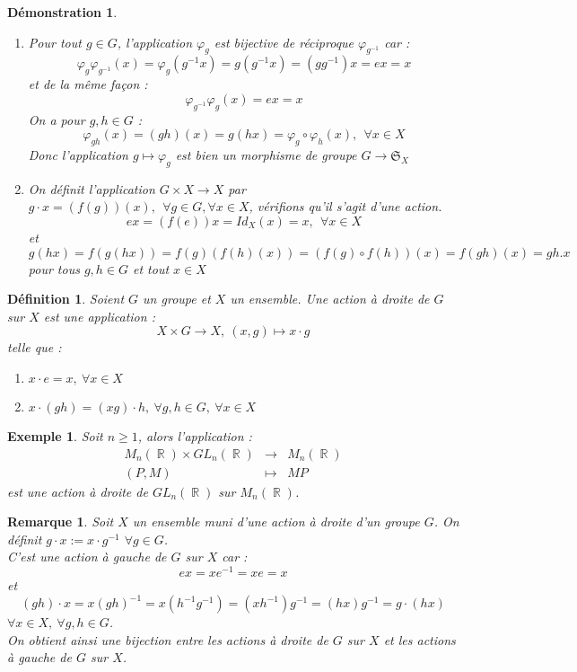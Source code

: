 \documentclass[a4paper, oneside]{report}
\theoremstyle{break}
\newtheorem{defi}[thm]{Définition}
\newtheorem{exem}[thm]{Exemple}
\newtheorem{remar}[thm]{Remarque}
\newtheorem*{demo}{Démonstration}
\newcommand{\x}{\times}
\DeclareMathOperator{\R}{\mathbb{R}}
\renewcommand{\S}{\mathfrak{S}}
\begin{document}
\begin{demo}
	\begin{enumerate}
		\item Pour tout $g\in G$, l'application $\varphi_g$ est bijective de réciproque $\varphi_{g^{-1}}$ car :
		$$\varphi_g\varphi_{g^{-1}}(x)=\varphi_g(g^{-1}x)=g(g^{-1}x)=(gg^{-1})x=ex=x$$
		et de la même façon :
		$$\varphi_{g^{-1}}\varphi_g(x)=ex=x$$
		On a pour $g,h\in G$ :
		$$\varphi_{gh}(x)=(gh)(x)=g(hx)=\varphi_g\circ \varphi_h(x),~~\forall x\in X$$
		Donc l'application $g\mapsto \varphi_g$ est bien un morphisme de groupe $G\rightarrow \S_X$
		\item On définit l'application $G\x X \rightarrow X$ par $g \cdot x = (f(g))(x),~~\forall g\in G,\forall x\in X$, vérifions qu'il s'agit d'une action.\\
		$$ex=(f(e))x=Id_X(x)=x,~~\forall x\in X$$
		et 
		$$g(hx)=f(g(hx))=f(g)(f(h)(x))=(f(g)\circ f(h) )(x)=f(gh)(x)=gh.x$$
		pour tous $g,h\in G$ et tout $x\in X$
	\end{enumerate}
\end{demo}


\begin{defi}
	Soient $G$ un groupe et $X$ un ensemble. Une action à droite de $G$ sur $X$ est une application :
	$$X\x G\rightarrow X,~(x,g)\mapsto x \cdot g$$
	telle que :
	\begin{enumerate}
		\item $x \cdot e=x,~\forall x\in X$
		\item $x \cdot (gh)=(xg) \cdot h,~\forall g,h\in G,~\forall x\in X$
	\end{enumerate}
\end{defi}

\begin{exem}
	Soit $n\geq 1$, alors l'application :
	$$\begin{array}{lll}
	M_n(\R)\x GL_n(\R)&\rightarrow & M_n(\R)\\
	(P,M)&\mapsto & MP
	\end{array}$$
	est une action à droite de $GL_n(\R)$ sur $M_n(\R)$.
\end{exem}

\begin{remar}
	Soit $X$ un ensemble muni d'une action à droite d'un groupe $G$. On définit $g \cdot x := x \cdot g^{-1}$ $\forall g\in G$.\\
	C'est une action à gauche de $G$ sur $X$ car :
	$$ex=xe^{-1}=xe=x$$
	et 
	$$(gh) \cdot x=x(gh)^{-1}=x(h^{-1}g^{-1})=(xh^{-1})g^{-1}=(hx)g^{-1}=g \cdot (hx)$$
	$\forall x\in X, ~\forall g,h\in G$.\\
	On obtient ainsi une bijection entre les actions à droite de $G$ sur $X$ et les actions à gauche de $G$ sur $X$.
\end{remar}
\end{document}
